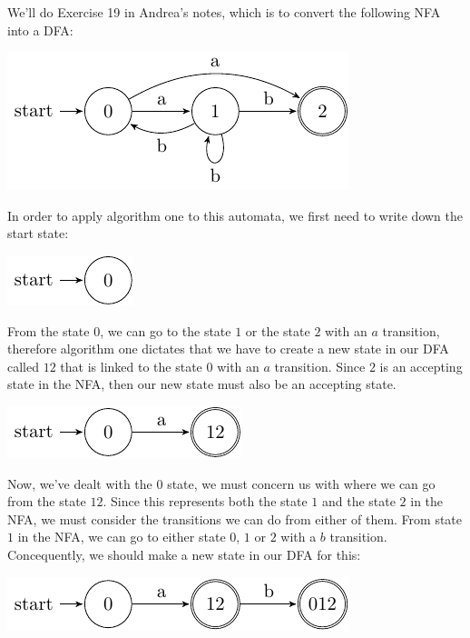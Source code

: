 We'll do Exercise 19 in Andrea's notes, which is to convert the following NFA
into a DFA:

\begin{center}
  \includegraphics{automata/5.pdf}
\end{center}

In order to apply algorithm one to this automata, we first need to write down
the start state:

\begin{center}
  \includegraphics{automata/6.pdf}
\end{center}

From the state $0$, we can go to the state $1$ or the state $2$ with an $a$
transition, therefore algorithm one dictates that we have to create a new state
in our DFA called $12$ that is linked to the state $0$ with an $a$ transition.
Since $2$ is an accepting state in the NFA, then our new state must also be an
accepting state.

\begin{center}
  \includegraphics{automata/7.pdf}
\end{center}

Now, we've dealt with the $0$ state, we must concern us with where we can go
from the state $12$. Since this represents both the state $1$ and the state $2$
in the NFA, we must consider the transitions we can do from either of them. From
state $1$ in the NFA, we can go to either state $0$, $1$ or $2$ with a $b$
transition. Concequently, we should make a new state in our DFA for this:

\begin{center}
  \includegraphics{automata/8.pdf}
\end{center}


